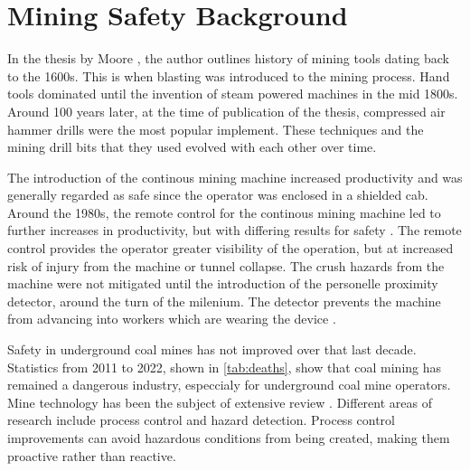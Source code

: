 \chapter{
Mining Safety Background
\label{chap:2}}

In the thesis by Moore \cite{11124/16423}, the author outlines history of mining tools
dating back to the 1600s. This is when blasting was introduced to the mining process.
Hand tools dominated until the invention of steam powered machines in the mid 1800s.
Around 100 years later, at the time of publication of the thesis, compressed air hammer drills
were the most popular implement. These techniques and the mining drill bits that they used
evolved with each other over time.

The introduction of the continous mining machine increased productivity and 
was generally regarded as safe since the operator was enclosed in a shielded cab.
Around the 1980s, the remote control for the continous mining machine led to 
further increases in productivity, but with differing results for safety \cite{KONONOV199521}.
The remote control provides the operator greater visibility of the operation, 
but at increased risk of injury from the machine or tunnel collapse.
The crush hazards from the machine were not mitigated until the introduction of the
personelle proximity detector, around the turn of the milenium.
The detector prevents the machine from advancing into 
workers which are wearing the device \cite{schiffbauer2001active}.

Safety in underground coal mines has not improved over that last decade.
Statistics from 2011 to 2022, shown in \ref{tab:deaths},
show that coal mining has remained a dangerous industry,
especcialy for underground coal mine operators.
Mine technology has been the subject of extensive review 
\cite{ijerph19042334, 7784796, RALSTON2014305, molaei:hal-02940030}.
Different areas of research include process control and hazard detection.
Process control improvements can avoid hazardous conditions from being created,
making them proactive rather than reactive.

